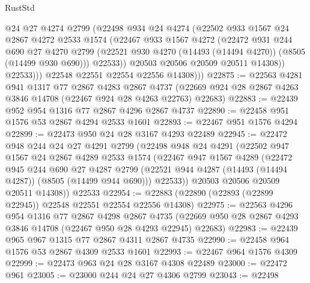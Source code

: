 \begin{lexlean}{RustStd}
\begin{coremodule}
                @24
                @27
                @4274
                @2799
                (@22498
                  @934
                  @24
                  @4274
                  (@22502
                    @933
                    @1567
                    @24
                    @2867
                    @4272
                    @2533
                    @1574
                    (@22467
                      @933
                      @1567
                      @4272
                      (@22472
                        @931
                        @244
                        @690
                        @27
                        @4270
                        @2799
                        (@22521 @930 @4270 (@14493 (@14494 @4270)) (@8505 (@14499 @930 @690)))
                        @22533))
                    @20503
                    @20506
                    @20509
                    @20511
                    @14308))
                @22533)))
          @22548
          @22551
          @22554
          @22556
          @14308)))
@22875 := @22563
    @4281
    @941
    @1317
    @77
    @2867
    @4283
    @2867
    @4737
    (@22669 @924 @28 @2867 @4263 @3846 @14708 (@22467 @924 @28 @4263 @22763) @22683)
@22883 := @22439 @952 @954 @1316 @77 @2867 @4296 @2867 @4737
@22890 := @22458 @951 @1576 @53 @2867 @4294 @2533 @1601
@22893 := @22467 @951 @1576 @4294
@22899 := @22473 @950 @24 @28 @3167 @4293 @22489
@22945 := @22472
    @948
    @244
    @24
    @27
    @4291
    @2799
    (@22498
      @948
      @24
      @4291
      (@22502
        @947
        @1567
        @24
        @2867
        @4289
        @2533
        @1574
        (@22467
          @947
          @1567
          @4289
          (@22472
            @945
            @244
            @690
            @27
            @4287
            @2799
            (@22521 @944 @4287 (@14493 (@14494 @4287)) (@8505 (@14499 @944 @690)))
            @22533))
        @20503
        @20506
        @20509
        @20511
        @14308))
    @22533
@22954 := @22883 (@22890 (@22893 (@22899 @22945)) @22548 @22551 @22554 @22556 @14308)
@22975 := @22563
    @4296
    @954
    @1316
    @77
    @2867
    @4298
    @2867
    @4735
    (@22669 @950 @28 @2867 @4293 @3846 @14708 (@22467 @950 @28 @4293 @22945) @22683)
@22983 := @22439 @965 @967 @1315 @77 @2867 @4311 @2867 @4735
@22990 := @22458 @964 @1576 @53 @2867 @4309 @2533 @1601
@22993 := @22467 @964 @1576 @4309
@22999 := @22473 @963 @24 @28 @3167 @4308 @22489
@23000 := @22472 @961
@23005 := @23000 @244 @24 @27 @4306 @2799
@23043 := @22498

\end{coremodule}
\end{lexlean}
